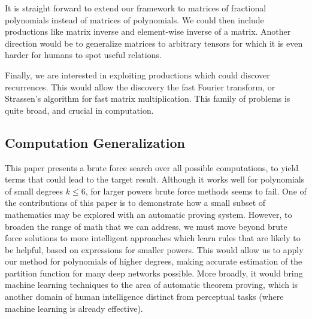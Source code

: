 It is straight forward to extend our framework to matrices of fractional
polynomials instead of matrices of polynomials.  We could
then include productions like matrix inverse and element-wise inverse of
a matrix.  Another direction would be to generalize matrices to arbitrary tensors
for which it is even harder for humans to spot useful relations.

Finally, we are interested in exploiting productions which could discover 
recurrences. This would allow the discovery the fast Fourier transform, or
Strassen's algorithm for fast matrix multiplication. This family of problems is quite broad,
and crucial in computation.


\subsection{Computation Generalization}
\label{subsec:agenda}

This paper presents a brute force search over all possible computations, 
to yield terms that could lead to the target result. Although it works
well for polynomials of small degrees $k \leq 6$, for larger powers 
brute force methods seems to fail. One of the contributions of this paper is to
demonstrate how a small subset of mathematics may be explored with an automatic proving
system. However, to broaden the range of math that we can address, we
must move beyond brute force solutions to more intelligent approaches
which learn rules that are likely to be helpful, based on expressions
for smaller powers. This would allow us to apply our method for polynomials of 
higher degrees, making accurate estimation of the partition function for many deep
networks possible. More broadly, it would bring machine learning techniques
to the area of automatic theorem proving, which is another domain of
human intelligence distinct from perceptual tasks (where machine
learning is already effective). 




